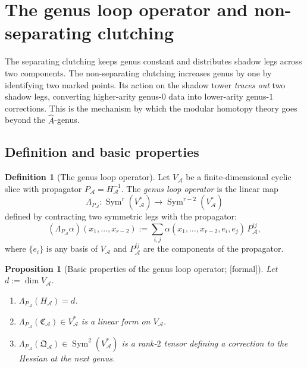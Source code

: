 \documentclass[11pt,oneside]{memoir}
\numberwithin{equation}{chapter}
\newtheorem{proposition}[theorem]{Proposition}
\theoremstyle{definition}
\newtheorem{definition}[theorem]{Definition}
\newcommand{\ClaimStatusProvedHere}{\textnormal{[formal]}}
\newcommand{\cA}{\mathcal A}
\begin{document}
\section{The genus loop operator and non-separating clutching}
\label{sec:nms-genus-loop-operator}

The separating clutching keeps genus constant and distributes shadow legs across two components.  The non-separating clutching increases genus by one by identifying two marked points.  Its action on the shadow tower \emph{traces out} two shadow legs, converting higher-arity genus-$0$ data into lower-arity genus-$1$ corrections.  This is the mechanism by which the modular homotopy theory goes beyond the $\hat{A}$-genus.

\subsection{Definition and basic properties}
\label{subsec:nms-genus-loop-definition}

\begin{definition}[The genus loop operator]
\label{def:nms-genus-loop-operator}
Let $V_{\cA}$ be a finite-dimensional cyclic slice with propagator $P_{\cA}=H_{\cA}^{-1}$.  The \emph{genus loop operator} is the linear map
\begin{equation}
\label{eq:nms-genus-loop-operator}
\Lambda_{P_{\cA}}:\operatorname{Sym}^r(V_{\cA}^*)\longrightarrow \operatorname{Sym}^{r-2}(V_{\cA}^*)
\end{equation}
defined by contracting two symmetric legs with the propagator:
\begin{equation}
\label{eq:nms-genus-loop-formula}
(\Lambda_{P_{\cA}}\alpha)(x_1,\dots,x_{r-2})
:=
\sum_{i,j}
\alpha(x_1,\dots,x_{r-2},e_i,e_j)\,P_{\cA}^{ij},
\end{equation}
where $\{e_i\}$ is any basis of $V_{\cA}$ and $P_{\cA}^{ij}$ are the components of the propagator.
\end{definition}

\begin{proposition}[Basic properties of the genus loop operator; \ClaimStatusProvedHere]
\label{prop:nms-genus-loop-properties}
Let $d:=\dim V_{\cA}$.
\begin{enumerate}[label=\textup{(\roman*)}]
\item $\Lambda_{P_{\cA}}(H_{\cA})=d$.
\item $\Lambda_{P_{\cA}}(\mathfrak C_{\cA})\in V_{\cA}^*$ is a linear form on $V_{\cA}$.
\item $\Lambda_{P_{\cA}}(\mathfrak Q_{\cA})\in \operatorname{Sym}^2(V_{\cA}^*)$ is a rank-$2$ tensor defining a correction to the Hessian at the next genus.
\end{enumerate}
\end{proposition}
\end{document}
